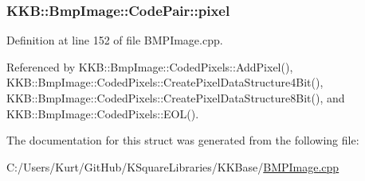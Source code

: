 \subsubsection[{\texorpdfstring{pixel}{pixel}}]{ K\+K\+B\+::\+Bmp\+Image\+::\+Code\+Pair\+::pixel}\hypertarget{struct_bmp_image_1_1_code_pair_ac341a7d727f931dc9c446eb1d67fe022}{}\label{struct_bmp_image_1_1_code_pair_ac341a7d727f931dc9c446eb1d67fe022}


Definition at line 152 of file B\+M\+P\+Image.\+cpp.



Referenced by K\+K\+B\+::\+Bmp\+Image\+::\+Coded\+Pixels\+::\+Add\+Pixel(), K\+K\+B\+::\+Bmp\+Image\+::\+Coded\+Pixels\+::\+Create\+Pixel\+Data\+Structure4\+Bit(), K\+K\+B\+::\+Bmp\+Image\+::\+Coded\+Pixels\+::\+Create\+Pixel\+Data\+Structure8\+Bit(), and K\+K\+B\+::\+Bmp\+Image\+::\+Coded\+Pixels\+::\+E\+O\+L().



The documentation for this struct was generated from the following file\+:\begin{DoxyCompactItemize}
\item 
C\+:/\+Users/\+Kurt/\+Git\+Hub/\+K\+Square\+Libraries/\+K\+K\+Base/\hyperlink{_b_m_p_image_8cpp}{B\+M\+P\+Image.\+cpp}\end{DoxyCompactItemize}
